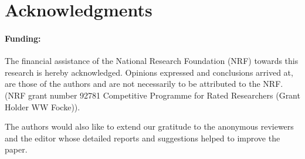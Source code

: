 \documentclass[smallcondensed]{svjour3}     %
\begin{document}















\section*{Acknowledgments}
\paragraph{Funding:} The financial assistance of the National Research Foundation (NRF) towards this research is hereby acknowledged. Opinions expressed and conclusions arrived at, are those of the authors and are not necessarily to be attributed to the NRF. (NRF grant number 92781 Competitive Programme for Rated Researchers (Grant Holder WW Focke)).

The authors would also like to extend our gratitude to the anonymous reviewers and the editor whose detailed reports and suggestions helped to improve the paper.
\end{document}
